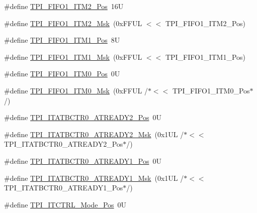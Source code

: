 \begin{DoxyCompactItemize}
\item 
\#define \mbox{\hyperlink{group___c_m_s_i_s___t_p_i_ga1828c228f3940005f48fb8dd88ada35b}{T\+P\+I\+\_\+\+F\+I\+F\+O1\+\_\+\+I\+T\+M2\+\_\+\+Pos}}~16U
\item 
\#define \mbox{\hyperlink{group___c_m_s_i_s___t_p_i_gae54512f926ebc00f2e056232aa21d335}{T\+P\+I\+\_\+\+F\+I\+F\+O1\+\_\+\+I\+T\+M2\+\_\+\+Msk}}~(0x\+F\+F\+U\+L $<$$<$ T\+P\+I\+\_\+\+F\+I\+F\+O1\+\_\+\+I\+T\+M2\+\_\+\+Pos)
\item 
\#define \mbox{\hyperlink{group___c_m_s_i_s___t_p_i_gaece86ab513bc3d0e0a9dbd82258af49f}{T\+P\+I\+\_\+\+F\+I\+F\+O1\+\_\+\+I\+T\+M1\+\_\+\+Pos}}~8U
\item 
\#define \mbox{\hyperlink{group___c_m_s_i_s___t_p_i_ga3347f42828920dfe56e3130ad319a9e6}{T\+P\+I\+\_\+\+F\+I\+F\+O1\+\_\+\+I\+T\+M1\+\_\+\+Msk}}~(0x\+F\+F\+U\+L $<$$<$ T\+P\+I\+\_\+\+F\+I\+F\+O1\+\_\+\+I\+T\+M1\+\_\+\+Pos)
\item 
\#define \mbox{\hyperlink{group___c_m_s_i_s___t_p_i_ga2188671488417a52abb075bcd4d73440}{T\+P\+I\+\_\+\+F\+I\+F\+O1\+\_\+\+I\+T\+M0\+\_\+\+Pos}}~0U
\item 
\#define \mbox{\hyperlink{group___c_m_s_i_s___t_p_i_ga8ae09f544fc1a428797e2a150f14a4c9}{T\+P\+I\+\_\+\+F\+I\+F\+O1\+\_\+\+I\+T\+M0\+\_\+\+Msk}}~(0x\+F\+F\+U\+L /$\ast$$<$$<$ T\+P\+I\+\_\+\+F\+I\+F\+O1\+\_\+\+I\+T\+M0\+\_\+\+Pos$\ast$/)
\item 
\#define \mbox{\hyperlink{group___c_m_s_i_s___t_p_i_ga3f0249dfcfd58090c08fd4a0adea6b22}{T\+P\+I\+\_\+\+I\+T\+A\+T\+B\+C\+T\+R0\+\_\+\+A\+T\+R\+E\+A\+D\+Y2\+\_\+\+Pos}}~0U
\item 
\#define \mbox{\hyperlink{group___c_m_s_i_s___t_p_i_gaf985067de6e6e68fbbd2350646b9125e}{T\+P\+I\+\_\+\+I\+T\+A\+T\+B\+C\+T\+R0\+\_\+\+A\+T\+R\+E\+A\+D\+Y2\+\_\+\+Msk}}~(0x1\+U\+L /$\ast$$<$$<$ T\+P\+I\+\_\+\+I\+T\+A\+T\+B\+C\+T\+R0\+\_\+\+A\+T\+R\+E\+A\+D\+Y2\+\_\+\+Pos$\ast$/)
\item 
\#define \mbox{\hyperlink{group___c_m_s_i_s___t_p_i_gaded82241155665db59493d912d44c65c}{T\+P\+I\+\_\+\+I\+T\+A\+T\+B\+C\+T\+R0\+\_\+\+A\+T\+R\+E\+A\+D\+Y1\+\_\+\+Pos}}~0U
\item 
\#define \mbox{\hyperlink{group___c_m_s_i_s___t_p_i_ga21e1f9c5532e75ee2edc8eb4cf69b1f0}{T\+P\+I\+\_\+\+I\+T\+A\+T\+B\+C\+T\+R0\+\_\+\+A\+T\+R\+E\+A\+D\+Y1\+\_\+\+Msk}}~(0x1\+U\+L /$\ast$$<$$<$ T\+P\+I\+\_\+\+I\+T\+A\+T\+B\+C\+T\+R0\+\_\+\+A\+T\+R\+E\+A\+D\+Y1\+\_\+\+Pos$\ast$/)
\item 
\#define \mbox{\hyperlink{group___c_m_s_i_s___t_p_i_gaa847adb71a1bc811d2e3190528f495f0}{T\+P\+I\+\_\+\+I\+T\+C\+T\+R\+L\+\_\+\+Mode\+\_\+\+Pos}}~0U

\end{DoxyCompactItemize}
